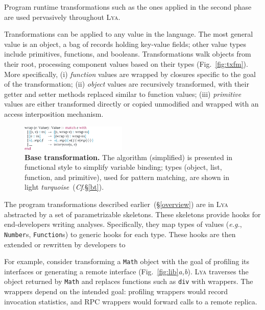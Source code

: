 \documentclass[letterpaper,twocolumn,10pt]{article}
\def\eg{{\em e.g.}, }
\newcommand{\ttt}[1]{\texttt{#1}}
\newcommand{\cf}[1]{(\emph{Cf}.\S\ref{#1})}
\newcommand{\sx}[1]{(\S\ref{#1})}
\newcommand{\sys}{{\scshape Lya}\xspace}
\begin{document}
Program runtime transformations such as the ones applied in the second phase are used pervasively throughout \sys.

Transformations can be applied to any value in the language. 
The most general value is an object, a bag of records holding key-value fields;
  other value types include primitives, functions, and booleans.
Transformations walk objects from their root, processing component values based on their types (Fig.~\ref{fig:txfm}).
More specifically,
  (i) \emph{function} values are wrapped by closures specific to the goal of the transformation; %
  (ii) \emph{object} values are recursively transformed, with their getter and setter methods replaced similar to function values; %
  (iii) \emph{primitive} values are either transformed directly or copied unmodified and wrapped with an access interposition mechanism.

\begin{figure}[t]
\raggedleft 
\includegraphics[width=0.45\textwidth]{./figs/lya_base.pdf}
\caption{
  \textbf{Base transformation.}
  \textmd{
  The algorithm (simplified) is presented in functional style to simplify variable binding; types (object, list, function, and primitive), used for pattern matching, are shown in light {\color{cdb} \emph{turquoise}}~\cf{bt}.
  }
}
\label{fig:base}
\end{figure}


The program transformations described earlier~\sx{overview} are in \sys  abstracted by a set of parametrizable skeletons.
These skeletons provide hooks for end-developers writing analyses.
Specifically, they map types of values (\eg \ttt{Number}s, \ttt{Function}s) to generic hooks for each type. 
These hooks are then extended or rewritten by developers to

For example, consider transforming a \ttt{Math} object with the goal of profiling its interfaces or generating a remote interface (Fig.~\ref{fig:lib}\emph{a,b}).
\sys traverses the object returned by \ttt{Math} and replaces functions such as \ttt{div} with wrappers.
The wrappers depend on the intended goal:
  profiling wrappers would record invocation statistics, and RPC wrappers would forward calls to a remote replica.
\end{document}
